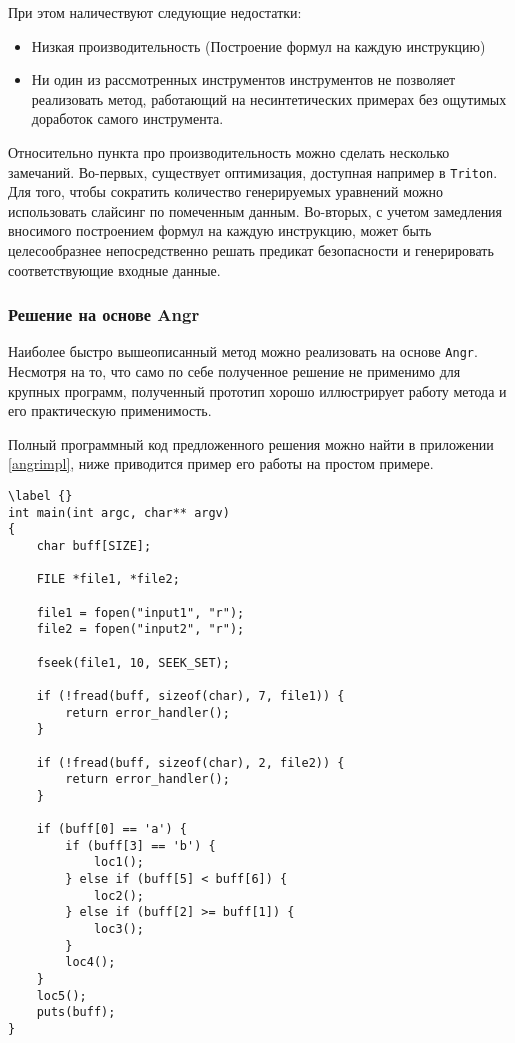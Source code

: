 При этом наличествуют следующие недостатки:
\begin{itemize}
  \item Низкая производительность (Построение формул на каждую инструкцию)
  \item Ни один из рассмотренных инструментов инструментов не позволяет реализовать метод, работающий на несинтетических примерах без ощутимых доработок самого инструмента.
\end{itemize}

Относительно пункта про производительность можно сделать несколько замечаний.
Во-первых, существует оптимизация, доступная например в \texttt{Triton}. Для того, чтобы сократить количество генерируемых уравнений можно использовать слайсинг по помеченным данным.
Во-вторых, с учетом замедления вносимого построением формул на каждую инструкцию, может быть целесообразнее непосредственно решать предикат безопасности и генерировать соответствующие входные данные.

\subsubsection{Решение на основе Angr}

Наиболее быстро вышеописанный метод можно реализовать на основе \texttt{Angr}. Несмотря на то, что само по себе полученное решение не применимо для крупных программ, полученный прототип хорошо иллюстрирует работу метода и его практическую применимость.

Полный программный код предложенного решения можно найти в приложении \ref{angrimpl}, ниже приводится пример его работы на простом примере.

\begin{lstlisting}[environoment=C_LANG, caption=jumper.c, label={lst:jumper}, captionpos=b]
\label {}
int main(int argc, char** argv)
{
    char buff[SIZE];

    FILE *file1, *file2;

    file1 = fopen("input1", "r");
    file2 = fopen("input2", "r");

    fseek(file1, 10, SEEK_SET);

    if (!fread(buff, sizeof(char), 7, file1)) {
        return error_handler();
    }

    if (!fread(buff, sizeof(char), 2, file2)) {
        return error_handler();
    }

    if (buff[0] == 'a') {
        if (buff[3] == 'b') {
            loc1();
        } else if (buff[5] < buff[6]) {
            loc2();
        } else if (buff[2] >= buff[1]) {
            loc3();
        }
        loc4();
    }
    loc5();
    puts(buff);
}
\end{lstlisting}


